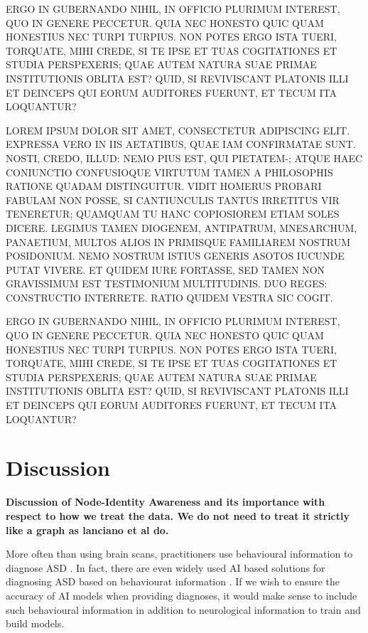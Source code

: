 \documentclass[letterpaper]{article}
\begin{document}
ERGO IN GUBERNANDO NIHIL, IN OFFICIO PLURIMUM INTEREST, QUO IN GENERE PECCETUR. QUIA NEC HONESTO QUIC QUAM HONESTIUS NEC TURPI TURPIUS. NON POTES ERGO ISTA TUERI, TORQUATE, MIHI CREDE, SI TE IPSE ET TUAS COGITATIONES ET STUDIA PERSPEXERIS; QUAE AUTEM NATURA SUAE PRIMAE INSTITUTIONIS OBLITA EST? QUID, SI REVIVISCANT PLATONIS ILLI ET DEINCEPS QUI EORUM AUDITORES FUERUNT, ET TECUM ITA LOQUANTUR?

LOREM IPSUM DOLOR SIT AMET, CONSECTETUR ADIPISCING ELIT. EXPRESSA VERO IN IIS AETATIBUS, QUAE IAM CONFIRMATAE SUNT. NOSTI, CREDO, ILLUD: NEMO PIUS EST, QUI PIETATEM-; ATQUE HAEC CONIUNCTIO CONFUSIOQUE VIRTUTUM TAMEN A PHILOSOPHIS RATIONE QUADAM DISTINGUITUR. VIDIT HOMERUS PROBARI FABULAM NON POSSE, SI CANTIUNCULIS TANTUS IRRETITUS VIR TENERETUR; QUAMQUAM TU HANC COPIOSIOREM ETIAM SOLES DICERE. LEGIMUS TAMEN DIOGENEM, ANTIPATRUM, MNESARCHUM, PANAETIUM, MULTOS ALIOS IN PRIMISQUE FAMILIAREM NOSTRUM POSIDONIUM. NEMO NOSTRUM ISTIUS GENERIS ASOTOS IUCUNDE PUTAT VIVERE. ET QUIDEM IURE FORTASSE, SED TAMEN NON GRAVISSIMUM EST TESTIMONIUM MULTITUDINIS. DUO REGES: CONSTRUCTIO INTERRETE. RATIO QUIDEM VESTRA SIC COGIT.

ERGO IN GUBERNANDO NIHIL, IN OFFICIO PLURIMUM INTEREST, QUO IN GENERE PECCETUR. QUIA NEC HONESTO QUIC QUAM HONESTIUS NEC TURPI TURPIUS. NON POTES ERGO ISTA TUERI, TORQUATE, MIHI CREDE, SI TE IPSE ET TUAS COGITATIONES ET STUDIA PERSPEXERIS; QUAE AUTEM NATURA SUAE PRIMAE INSTITUTIONIS OBLITA EST? QUID, SI REVIVISCANT PLATONIS ILLI ET DEINCEPS QUI EORUM AUDITORES FUERUNT, ET TECUM ITA LOQUANTUR?



\section{Discussion}
\textbf{Discussion of Node-Identity Awareness and its importance with respect to how we treat the data. We do not need to treat it strictly like a graph as lanciano et al do.}

More often than using brain scans, practitioners use behavioural information to diagnose ASD \cite{lord2006, johnson2007, dsm52013}.
In fact, there are even widely used AI based solutions for diagnosing ASD based on behaviourat information \cite{knopf2021}.
If we wish to ensure the accuracy of AI models when providing diagnoses, it would make sense to include such behavioural information in addition to neurological information to train and build models.
\end{document}
